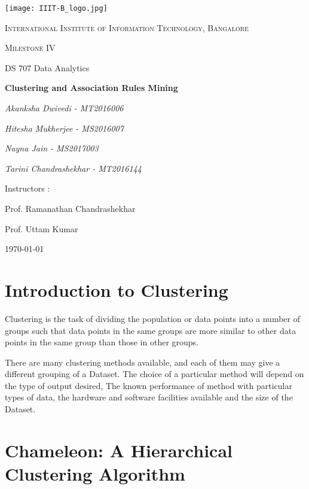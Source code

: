 \documentclass{article}
\begin{document}
\begin{titlepage}
	\centering
	\texttt{[image: IIIT-B\_logo.jpg]}\par\vspace{1cm}
	{\scshape\LARGE International Institute of Information Technology, Bangalore \par}
	\vspace{1cm}
	{\scshape\Large Milestone IV \par}
	{\Large  DS 707 Data Analytics\par}
	\vspace{1.5cm}
	{\huge\bfseries Clustering and Association Rules Mining \par}
	\vspace{2cm}
	{\Large\itshape Akanksha Dwivedi - MT2016006\par}
	{\Large\itshape Hitesha Mukherjee - MS2016007\par}
	{\Large\itshape Nayna Jain - MS2017003\par}
	{\Large\itshape Tarini Chandrashekhar - MT2016144\par}
	\vfill
	Instructors : \par
	Prof. Ramanathan Chandrashekhar
	\par
	Prof. Uttam Kumar

	\vfill
	{\large \today\par}
\end{titlepage}

\newpage

\tableofcontents

\newpage
\justify


\section{Introduction to Clustering}
Clustering is the task of dividing the population or data points into a number of groups such that data points in the same groups are more similar to other data points in the same group than those in other groups. \newline

There are many clustering methods available, and each of them may give a different grouping of a Dataset. The choice of a particular method will depend on the type of output desired, The known performance of method with particular types of data, the hardware and software facilities available and the size of the Dataset. 

\section{Chameleon: A Hierarchical Clustering Algorithm}
\end{document}
